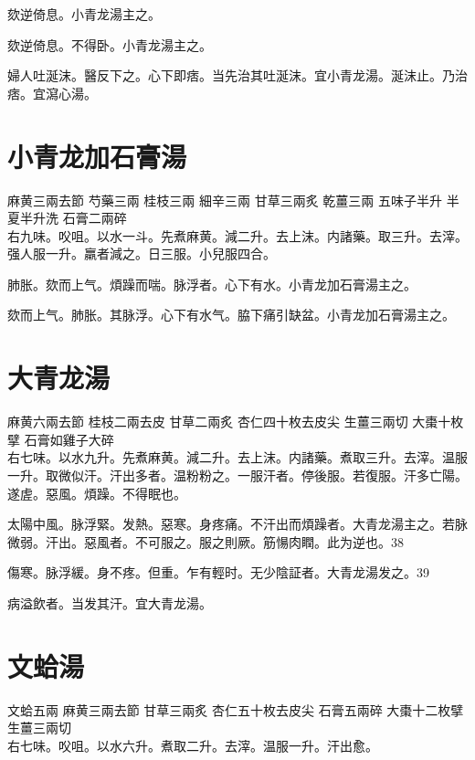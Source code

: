 欬逆倚息。小青龙湯主之。{\wuben}

欬逆倚息。不得卧。小青龙湯主之。{\dengben}

婦人吐涎沫。醫反下之。心下即痞。当先治其吐涎沫。宜小青龙湯。涎沫止。乃治痞。宜瀉心湯。

\section{小青龙加石膏湯}

麻黄{\scriptsize 三兩去節} 芍藥{\scriptsize 三兩} 桂枝{\scriptsize 三兩} 細辛{\scriptsize 三兩} 甘草{\scriptsize 三兩炙} 乾薑{\scriptsize 三兩} 五味子{\scriptsize 半升} 半夏{\scriptsize 半升洗} 石膏{\scriptsize 二兩碎}\\
右九味。㕮咀。以水一斗。先煮麻黄。減二升。去上沫。内諸藥。取三升。去滓。强人服一升。羸者減之。日三服。小兒服四合。

肺胀。欬而上气。煩躁而喘。脉浮者。心下有水。小青龙加石膏湯主之。

欬而上气。肺胀。其脉浮。心下有水气。脇下痛引缺盆。小青龙加石膏湯主之。

\section{大青龙湯}

麻黄{\scriptsize 六兩去節} 桂枝{\scriptsize 二兩去皮} 甘草{\scriptsize 二兩炙} 杏仁{\scriptsize 四十枚去皮尖} 生薑{\scriptsize 三兩切} 大棗{\scriptsize 十枚擘} 石膏{\scriptsize 如雞子大碎}\\
右七味。以水九升。先煮麻黄。減二升。去上沫。内諸藥。煮取三升。去滓。温服一升。取微似汗。汗出多者。温粉粉之。一服汗者。停後服。若復服。汗多亡陽。遂虗。惡風。煩躁。不得眠也。

太陽中風。脉浮緊。发熱。惡寒。身疼痛。不汗出而煩躁者。大青龙湯主之。若脉微弱。汗出。惡風者。不可服之。服之則厥。筋愓肉瞤。此为逆也。38

傷寒。脉浮緩。身不疼。但重。乍有輕时。无少陰証者。大青龙湯发之。39

病溢飲{\khaaitp 者}。当发其汗。宜大青龙湯。

\section{文蛤湯}

文蛤{\scriptsize 五兩} 麻黄{\scriptsize 三兩去節} 甘草{\scriptsize 三兩炙} 杏仁{\scriptsize 五十枚去皮尖} 石膏{\scriptsize 五兩碎} 大棗{\scriptsize 十二枚擘} 生薑{\scriptsize 三兩切}\\
右七味。㕮咀。以水六升。煮取二升。去滓。温服一升。汗出愈。

